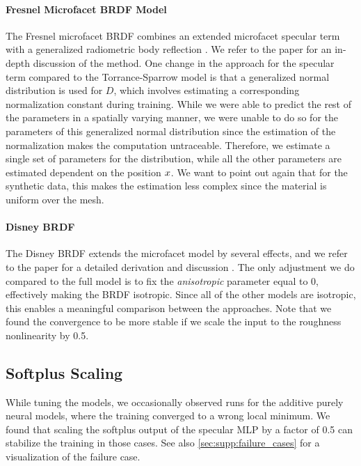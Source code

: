 \paragraph{Fresnel Microfacet BRDF Model}
The Fresnel microfacet BRDF combines an extended microfacet specular term with a generalized radiometric body reflection \cite{ichikawa2023fresnel}. We refer to the paper for an in-depth discussion of the method. One change in the approach for the specular term compared to the Torrance-Sparrow model is that a generalized normal distribution is used for $D$, which involves estimating a corresponding normalization constant during training. While we were able to predict the rest of the parameters in a spatially varying manner, we were unable to do so for the parameters of this generalized normal distribution since the estimation of the normalization makes the computation untraceable. Therefore, we estimate a single set of parameters for the distribution, while all the other parameters are estimated dependent on the position $x$. We want to point out again that for the synthetic data, this makes the estimation less complex since the material is uniform over the mesh.

\paragraph{Disney BRDF}
The Disney BRDF extends the microfacet model by several effects, and we refer to the paper for a detailed derivation and discussion \cite{burley2012physically}. The only adjustment we do compared to the full model is to fix the \emph{anisotropic} parameter equal to 0, effectively making the BRDF isotropic. Since all of the other models are isotropic, this enables a meaningful comparison between the approaches. Note that we found the convergence to be more stable if we scale the input to the roughness nonlinearity by 0.5.

\subsection{Softplus Scaling}
\label{sec:supp:softplusScaling}

While tuning the models, we occasionally observed runs for the additive purely neural models, where the training converged to a wrong local minimum. We found that scaling the softplus output of the specular MLP by a factor of 0.5 can stabilize the training in those cases. See also \cref{sec:supp:failure_cases} for a visualization of the failure case.